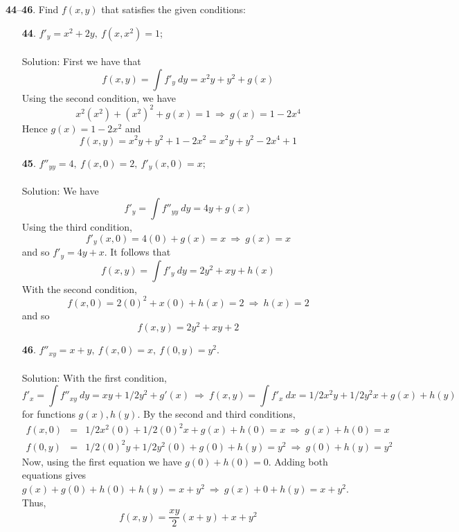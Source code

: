 \documentclass[12pt]{amsbook}
\begin{document}
\noindent
{\small {\bf 44}--{\bf 46}}. Find $f(x, y)$ that satisfies the given conditions:
\begin{enumerate}
\item[{\small\bf 44}.] $f'_y=x^2+2y, \ f(x,x^2)=1$;
\\
\\
{\sc Solution}: First we have that
$$f(x,y)=\int f'_y \ dy= x^2y+y^2+g(x)$$
Using the second condition, we have
$$x^2(x^2)+(x^2)^2+g(x)=1 \ \Rightarrow \ g(x)=1-2x^4$$
Hence $g(x)=1-2x^2$ and
$$f(x,y)=x^2y+y^2+1-2x^2=x^2y+y^2-2x^4+1$$
\item[{\small\bf 45}.] $f''_{yy}=4, \ f(x,0)=2, \ f'_y(x,0)=x$;
\\
\\
{\sc Solution}: We have
$$f'_y=\int f''_{yy} \ dy= 4y+g(x)$$
Using the third condition, 
$$f'_y(x,0)=4(0)+g(x)=x \ \Rightarrow \ g(x)=x$$
and so $f'_y=4y+x$. It follows that
$$f(x,y)=\int f'_y \ dy = 2y^2+xy+h(x)$$
With the second condition,
$$f(x,0)=2(0)^2+x(0)+h(x)=2 \ \Rightarrow  \ h(x)=2$$
and so
$$f(x,y)=2y^2+xy+2$$
\item[{\small\bf 46}.] $f''_{xy}=x+y, \ f(x,0)=x, \ f(0,y)=y^2$.
\\
\\
{\sc Solution}: With the first condition,
$$f'_x=\int f''_{xy} \ dy= xy+1/2y^2 + g'(x) \ \Rightarrow  \ f(x,y)= \int f'_x \ dx = 1/2x^2y+1/2y^2x+g(x)+h(y)$$
for functions $g(x), h(y)$. By the second and third conditions,
\begin{eqnarray*}
f(x,0)&=&1/2x^2(0)+1/2(0)^2x+g(x)+h(0)=x \ \Rightarrow \ g(x)+h(0)=x \\
f(0,y)&=&1/2(0)^2y+1/2y^2(0)+g(0)+h(y)=y^2 \ \Rightarrow \ g(0)+h(y)=y^2 
\end{eqnarray*}
Now, using the first equation we have $g(0)+h(0)=0$. Adding both equations gives $g(x)+g(0)+h(0)+h(y)=x+y^2 \ \Rightarrow \ g(x)+0+h(y)=x+y^2$. Thus,
$$f(x,y)=\frac{xy}{2}(x+y)+x+y^2$$
\end{enumerate}


\newpage
\end{document}
